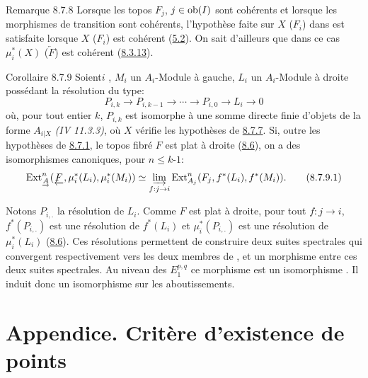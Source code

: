 \documentclass[10pt]{../fichiers-configuration-latex/smfart}
\begin{document}
\begin{enonce*}[remark]{Remarque 8.7.8}
Lorsque les topos $F_j$, $j \in \operatorname{ob} (I)$ sont cohérents et lorsque les
morphismes de transition sont cohérents, l'hypothèse faite sur $X$
(\resp $F_i$) dans  est satisfaite
lorsque $X$ (\resp $F_i$) est
cohérent (\hyperref[VI.cor5.2]{5.2}). On sait d'ailleurs que dans ce cas $\mu^{\ast}_i (X)$
(\resp $\underleftarrow{F}$) est cohérent (\hyperref[VI.thm8.3.13]{8.3.13}).
\end{enonce*}

\begin{enonce*}{Corollaire 8.7.9}
Soient\pageoriginale $i$ , $M_i$ un $A_i$-Module à gauche, $L_i$ un
$A_i$-Module à droite possédant la résolution du type:
$$
P_{i, k} \to P_{i, k-1} \to \cdots \to P_{i, 0} \to L_i \to 0
$$
où, pour tout entier $k$, $P_{i, k}$ est isomorphe à une somme directe
finie d'objets de la forme $A_{i|X}$ \emph{(IV 11.3.3)}, où $X$ vérifie les
hypothèses de \hyperref[VI.cor8.7.7]{8.7.7}. Si, outre les hypothèses de \hyperref[VI.subsubsec8.7.1]{8.7.1}, le topos fibré
$F$ est plat à droite (\hyperref[VI.subsec8.6]{8.6}), on a des isomorphismes canoniques, pour
$n \leq k$-$1$:
\begin{equation*}
\Ext^n_{\underrightarrow{A}}(\underleftarrow{F}, \mu^{\ast}_i(L_i),
\mu^{\ast}_i (M_i)) \simeq \varinjlim_{f : j \to i}
\Ext^{n}_{A_j} (F_j, f^{\ast}(L_i), f^{\ast} (M_i)){\quoi}.\tag{8.7.9.1}
\end{equation*}
\end{enonce*}

\noindent
Notons $P_{i,.}$ la résolution de $L_i$. Comme $F$ est plat à
droite, pour tout $f : j \to i$, $f^{\ast}(P_{i,.})$ est une
résolution de $f^{\ast}(L_i)$ et $\mu^{\ast}_i(P_{i,.})$ est une
  résolution de $\mu^{\ast}_i(L_i)$ (\hyperref[VI.subsec8.6]{8.6}). Ces résolutions permettent
  de construire deux suites spectrales qui convergent respectivement
  vers les deux membres de , et un morphisme entre ces deux
  suites spectrales. Au niveau des $E^{p, q}_1$ ce morphisme est un
  isomorphisme . Il induit donc un isomorphisme sur les
  aboutissements.

\section{Appendice. Critère d'existence de points}
\end{document}
